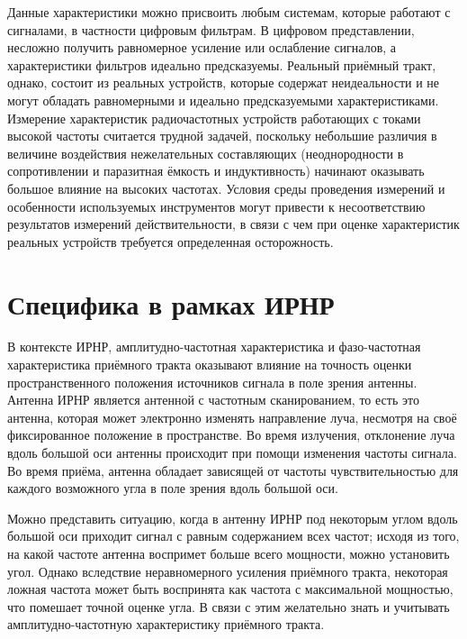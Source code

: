 \documentclass{report}
\begin{document}
Данные характеристики можно присвоить любым системам, которые работают с сигналами, в частности цифровым фильтрам. В цифровом представлении, несложно получить равномерное усиление или ослабление сигналов, а характеристики фильтров идеально предсказуемы. Реальный приёмный тракт, однако, состоит из реальных устройств, которые содержат неидеальности и не могут обладать равномерными и идеально предсказуемыми характеристиками. Измерение характеристик радиочастотных устройств работающих с токами высокой частоты считается трудной задачей, поскольку небольшие различия в величине воздействия нежелательных составляющих (неоднородности в сопротивлении и паразитная ёмкость и индуктивность) начинают оказывать большое влияние на высоких частотах. Условия среды проведения измерений и особенности используемых инструментов могут привести к несоответствию результатов измерений действительности, в связи с чем при оценке характеристик реальных устройств требуется определенная осторожность.

\section{Специфика в рамках ИРНР}

В контексте ИРНР, амплитудно-частотная характеристика и фазо-частотная характеристика приёмного тракта оказывают влияние на точность оценки пространственного положения источников сигнала в поле зрения антенны. Антенна ИРНР является антенной с частотным сканированием, то есть это антенна, которая может электронно изменять направление луча, несмотря на своё фиксированное положение в пространстве. Во время излучения, отклонение луча вдоль большой оси антенны происходит при помощи изменения частоты сигнала. Во время приёма, антенна обладает зависящей от частоты чувствительностью для каждого возможного угла в поле зрения вдоль большой оси.

Можно представить ситуацию, когда в антенну ИРНР под некоторым углом вдоль большой оси приходит сигнал с равным содержанием всех частот; исходя из того, на какой частоте антенна воспримет больше всего мощности, можно установить угол. Однако вследствие неравномерного усиления приёмного тракта, некоторая ложная частота может быть воспринята как частота с максимальной мощностью, что помешает точной оценке угла. В связи с этим желательно знать и учитывать амплитудно-частотную характеристику приёмного тракта.
\end{document}
